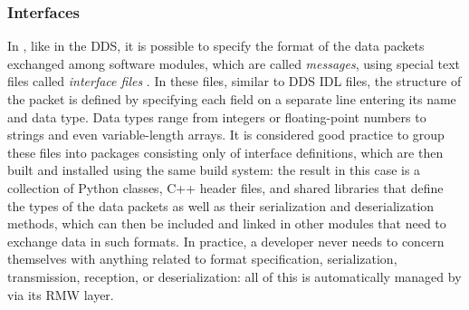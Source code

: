 \subsubsection{Interfaces}
\label{sec:ros2_interfaces}
In \ROS, like in the DDS, it is possible to specify the format of the data packets exchanged among software modules, which are called \emph{messages}, using special text files called \emph{interface files} \cite{thomas_interface_2019}. In these files, similar to DDS IDL files, the structure of the packet is defined by specifying each field on a separate line entering its name and data type. Data types range from integers or floating-point numbers to strings and even variable-length arrays. It is considered good practice to group these files into packages consisting only of interface definitions, which are then built and installed using the same build system: the result in this case is a collection of Python classes, C++ header files, and shared libraries that define the types of the data packets as well as their serialization and deserialization methods, which can then be included and linked in other modules that need to exchange data in such formats. In practice, a \ROS developer never needs to concern themselves with anything related to format specification, serialization, transmission, reception, or deserialization: all of this is automatically managed by \ROS via its RMW layer.

